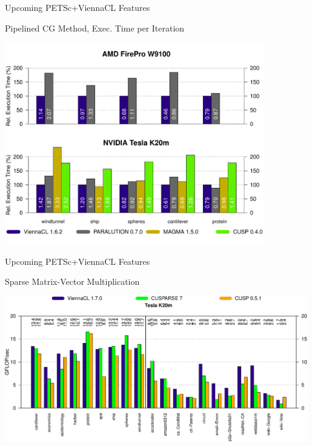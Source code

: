 \begin{frame}{Upcoming PETSc+ViennaCL Features}
  \begin{block}{Pipelined CG Method, Exec. Time per Iteration}
  \vspace*{-.5cm}
   \begin{center}
    \includegraphics[width=0.85\textwidth]{figures/cg}
   \end{center}
  \end{block}
\end{frame}

\begin{frame}{Upcoming PETSc+ViennaCL Features}
  \begin{block}{Sparse Matrix-Vector Multiplication}
   \begin{center}
    \includegraphics[width=0.99\textwidth]{figures/spmv-crop}
   \end{center}
  \end{block}
\end{frame}


